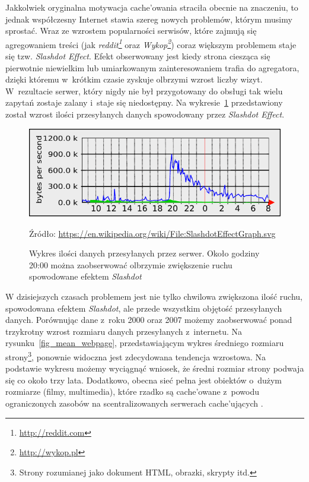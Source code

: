 \documentclass[a4paper,11pt]{scrartcl}
\newcommand{\figsource}[1]{
\captionsetup{font={scriptsize, it}}
\caption*{Źródło: \url{#1}}
\captionsetup{font={normalsize}}
}
\newcommand{\s}{ }
\newcommand{\keszujacych}{cache'ujących}
\newcommand{\keszowania}{cache'owania}
\newcommand{\keszowane}{cache'owane}
\begin{document}
Jakkolwiek oryginalna motywacja \keszowania\s straciła obecnie na znaczeniu, to jednak współczesny Internet stawia szereg nowych problemów, którym musimy sprostać. Wraz ze wzrostem popularności serwisów, które zajmują się agregowaniem treści (jak \textit{reddit\footnote{\url{http://reddit.com}}} oraz \textit{Wykop\footnote{\url{http://wykop.pl}}}) coraz większym problemem staje się tzw. \textit{Slashdot Effect}. Efekt obserwowany jest kiedy strona ciesząca się pierwotnie niewielkim lub umiarkowanym zainteresowaniem trafia do agregatora, dzięki któremu w~krótkim czasie zyskuje olbrzymi wzrost liczby wizyt. W~rezultacie serwer, który nigdy nie był przygotowany do obsługi tak wielu zapytań zostaje zalany i~staje się niedostępny. Na wykresie~\ref{fig_slashdot} przedstawiony został wzrost ilości przesyłanych danych spowodowany przez \textit{Slashdot Effect}.

\begin{figure}[h!]
\centering
\includegraphics[width=0.9\linewidth]{img/SlashdotEffectGraph.pdf}
\figsource{https://en.wikipedia.org/wiki/File:SlashdotEffectGraph.svg}
\caption{Wykres ilości danych przesyłanych przez serwer. Około godziny 20:00 można zaobserwować olbrzymie zwiększenie ruchu spowodowane efektem \textit{Slashdot}}
\label{fig_slashdot}
\end{figure}

W dzisiejszych czasach problemem jest nie tylko chwilowa zwiększona ilość ruchu, spowodowana efektem \textit{Slashdot}, ale przede wszystkim objętość przesyłanych danych. Porównując dane z~roku 2000 oraz 2007 możemy zaobserwować ponad trzykrotny wzrost rozmiaru danych przesyłanych z~internetu\cite{sadre2008changes}. Na rysunku~\ref{fig_mean_webpage}, przedstawiającym wykres średniego rozmiaru strony\footnote{Strony rozumianej jako dokument HTML, obrazki, skrypty itd.}, ponownie widoczna jest zdecydowana tendencja wzrostowa. Na podstawie wykresu możemy wyciągnąć wniosek, że średni rozmiar strony podwaja się co około trzy lata. Dodatkowo, obecna sieć pełna jest obiektów o~dużym rozmiarze (filmy, multimedia), które rzadko są \keszowane\s z~powodu ograniczonych zasobów na scentralizowanych serwerach \keszujacych\s\cite{sadre2008changes}.
\end{document}
